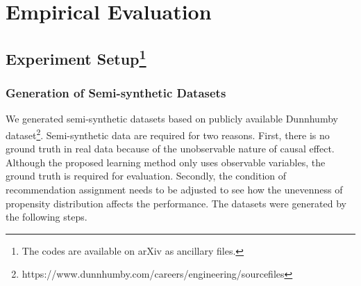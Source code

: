 \documentclass[manuscript,screen]{acmart}
\begin{document}
\section{Empirical Evaluation}

\subsection{Experiment Setup\protect\footnote{The codes are available on arXiv as ancillary files.}}

\subsubsection{Generation of Semi-synthetic Datasets}

We generated semi-synthetic datasets based on publicly available Dunnhumby dataset\footnote{https://www.dunnhumby.com/careers/engineering/sourcefiles}.
Semi-synthetic data are required for two reasons.
First, there is no ground truth in real data because of the unobservable nature of causal effect.
Although the proposed learning method only uses observable variables, the ground truth is required for evaluation.
Secondly, the condition of recommendation assignment needs to be adjusted to see how the unevenness of propensity distribution affects the performance.
The datasets were generated by the following steps.
\end{document}
